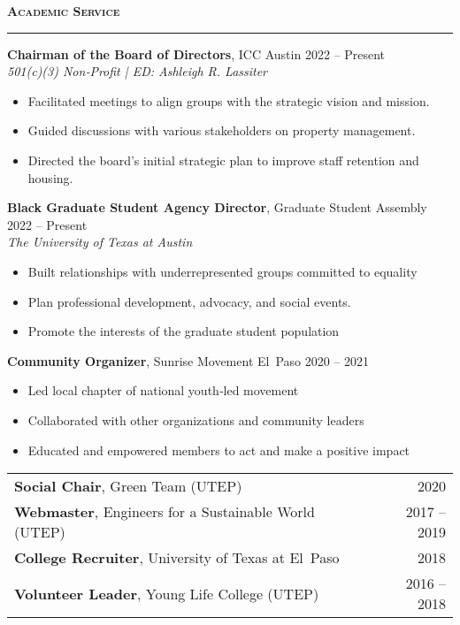 \documentclass[11pt]{article}
\newcommand{\sectionheading}[1]{%
  \vspace{1.2ex}%
  {\large\bfseries\textsc{#1}}\par\vspace{0.4ex}%
  \color{gray}\rule{\linewidth}{0.5pt}\color{black}\vspace{0.6ex}%
}
\begin{document}
\sectionheading{Academic Service}

\textbf{Chairman of the Board of Directors}, ICC Austin \hfill 2022 -- Present\\
\textit{501(c)(3) Non‐Profit \;|\; ED: Ashleigh R. Lassiter}
\begin{itemize}
  \item Facilitated meetings to align groups with the strategic vision and mission.
  \item Guided discussions with various stakeholders on property management.
  \item Directed the board’s initial strategic plan to improve staff retention and housing.
\end{itemize}

\textbf{Black Graduate Student Agency Director}, Graduate Student Assembly \hfill 2022 -- Present\\
\textit{The University of Texas at Austin}
\begin{itemize}
  \item Built relationships with underrepresented groups committed to equality
  \item Plan professional development, advocacy, and social events.
  \item Promote the interests of the graduate student population
\end{itemize}

\textbf{Community Organizer}, Sunrise Movement El Paso \hfill 2020 -- 2021
\begin{itemize}
  \item Led local chapter of national youth‐led movement
  \item Collaborated with other organizations and community leaders
  \item Educated and empowered members to act and make a positive impact
\end{itemize}

\begin{tabularx}{\textwidth}{@{}Y r@{}}
  \textbf{Social Chair}, Green Team (UTEP) & 2020\\[0.4ex]
  \textbf{Webmaster}, Engineers for a Sustainable World (UTEP) & 2017 -- 2019\\[0.4ex]
  \textbf{College Recruiter}, University of Texas at El Paso & 2018\\[0.4ex]
  \textbf{Volunteer Leader}, Young Life College (UTEP) & 2016 -- 2018\\
\end{tabularx}
\end{document}
